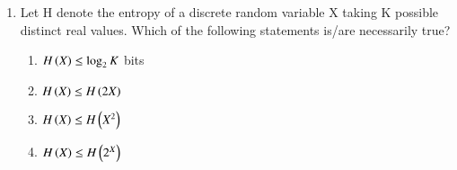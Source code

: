 \begin{enumerate}[label=\thesection.\arabic*,ref=\thesection.\theenumi]
	\item Let H denote the entropy of a discrete
random variable X taking K possible distinct
real values. Which of the following statements
is/are necessarily true?
\begin{enumerate}[label=(\Alph*)]
\item 
$H\left(X\right)\leq \log _{2} K$ bits\\
\item 
$H\left(X\right) \leq H\left(2X\right)$\\
\item
$H\left(X\right)\leq H\left(X^2\right)$\\
\item
$H\left(X\right) \leq H\left(2^X\right)$\\
\end{enumerate}

\end{enumerate}
